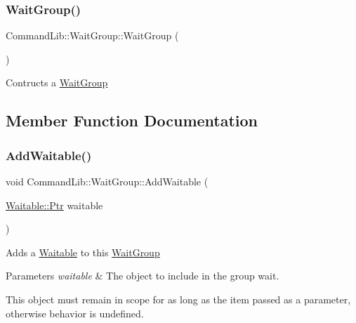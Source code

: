 \subsubsection{\texorpdfstring{Wait\+Group()}{WaitGroup()}}
{\footnotesize\ttfamily Command\+Lib\+::\+Wait\+Group\+::\+Wait\+Group (\begin{DoxyParamCaption}{ }\end{DoxyParamCaption})}



Contructs a \mbox{\hyperlink{class_command_lib_1_1_wait_group}{Wait\+Group}}



\subsection{Member Function Documentation}
\mbox{\label{class_command_lib_1_1_wait_group_a2ad37bdf4b472ad67c660ceb2a9ca0c9}} 
\subsubsection{\texorpdfstring{Add\+Waitable()}{AddWaitable()}}
{\footnotesize\ttfamily void Command\+Lib\+::\+Wait\+Group\+::\+Add\+Waitable (\begin{DoxyParamCaption}\item[{\mbox{\hyperlink{class_command_lib_1_1_waitable_ac74b6b91e48220146eada76a31cf2d9b}{Waitable\+::\+Ptr}}}]{waitable }\end{DoxyParamCaption})}



Adds a \mbox{\hyperlink{class_command_lib_1_1_waitable}{Waitable}} to this \mbox{\hyperlink{class_command_lib_1_1_wait_group}{Wait\+Group}}


\begin{DoxyParams}{Parameters}
{\em waitable} & The object to include in the group wait.\\
\hline
\end{DoxyParams}


This object must remain in scope for as long as the item passed as a parameter, otherwise behavior is undefined. \mbox{\label{class_command_lib_1_1_wait_group_a4fb05642c6c71d13c0e809f429c4baa0}} 
